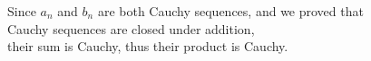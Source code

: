 \documentclass[preview]{standalone}
\begin{document}
\begin{center}
Since $a_n$ and $b_n$ are both Cauchy sequences, and we proved that\\Cauchy sequences are closed under addition, \\their sum is Cauchy, thus their product is Cauchy.
\end{center}
\end{document}
